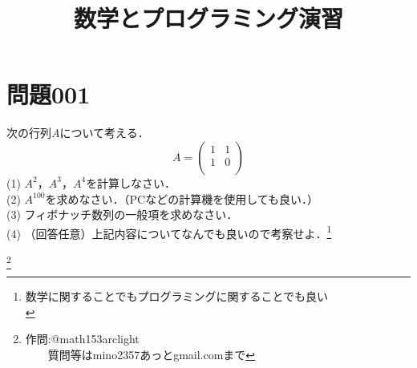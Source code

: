 \documentclass[12pt]{jarticle}
\title{数学とプログラミング演習}
\date{}
\begin{document}
\maketitle

\section*{問題001}

次の行列$A$について考える．
\[
  A = \left(
    \begin{array}{ccc}
      1 & 1 \\
      1 & 0 \\
    \end{array}
  \right)
\]
(1) $A^2$，$A^3$，$A^4$を計算しなさい．\\
(2) $A^{100}$を求めなさい．（PCなどの計算機を使用しても良い．）　\\
(3) フィボナッチ数列の一般項を求めなさい．\\
(4) （回答任意）上記内容についてなんでも良いので考察せよ．\footnote{数学に関することでもプログラミングに関することでも良い\\}

\footnote[0]{
作問:@math153arclight\\
　　質問等はmino2357あっとgmail.comまで
}

\thispagestyle{empty}
\end{document}

